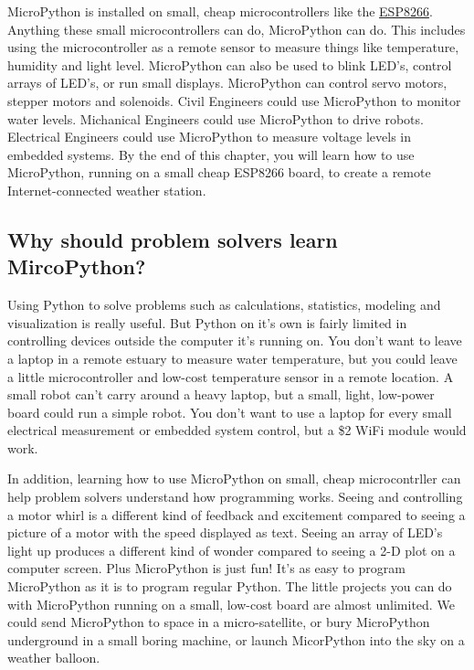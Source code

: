 \documentclass{book}
\begin{document}
    
        MicroPython is installed on small, cheap microcontrollers like the
\href{https://learn.adafruit.com/adafruit-feather-huzzah-esp8266}{ESP8266}.
Anything these small microcontrollers can do, MicroPython can do. This
includes using the microcontroller as a remote sensor to measure things
like temperature, humidity and light level. MicroPython can also be used
to blink LED's, control arrays of LED's, or run small displays.
MicroPython can control servo motors, stepper motors and solenoids.
Civil Engineers could use MicroPython to monitor water levels.
Michanical Engineers could use MicroPython to drive robots. Electrical
Engineers could use MicroPython to measure voltage levels in embedded
systems. By the end of this chapter, you will learn how to use
MicroPython, running on a small cheap ESP8266 board, to create a remote
Internet-connected weather station.
    




    
        \subsection{Why should problem solvers learn
MircoPython?}\label{why-should-problem-solvers-learn-mircopython}
    




    
        Using Python to solve problems such as calculations, statistics,
modeling and visualization is really useful. But Python on it's own is
fairly limited in controlling devices outside the computer it's running
on. You don't want to leave a laptop in a remote estuary to measure
water temperature, but you could leave a little microcontroller and
low-cost temperature sensor in a remote location. A small robot can't
carry around a heavy laptop, but a small, light, low-power board could
run a simple robot. You don't want to use a laptop for every small
electrical measurement or embedded system control, but a \$2 WiFi module
would work.

In addition, learning how to use MicroPython on small, cheap
microcontrller can help problem solvers understand how programming
works. Seeing and controlling a motor whirl is a different kind of
feedback and excitement compared to seeing a picture of a motor with the
speed displayed as text. Seeing an array of LED's light up produces a
different kind of wonder compared to seeing a 2-D plot on a computer
screen. Plus MicroPython is just fun! It's as easy to program
MicroPython as it is to program regular Python. The little projects you
can do with MicroPython running on a small, low-cost board are almost
unlimited. We could send MicroPython to space in a micro-satellite, or
bury MicroPython underground in a small boring machine, or launch
MicorPython into the sky on a weather balloon.
    
\end{document}
